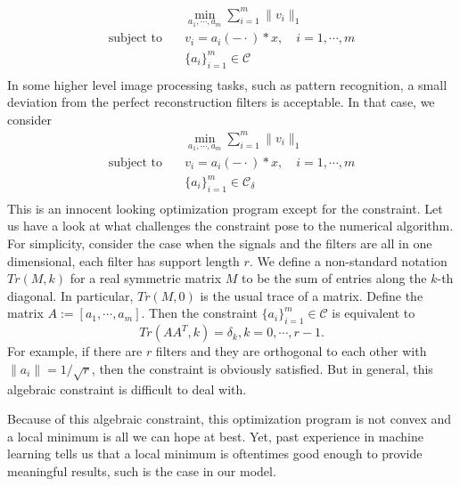 \documentclass[a4paper]{article}
\begin{document}
\begin{equation}
\label{model:m0}
\begin{aligned}
	&\min_{a_1,\cdots,a_m} \sum_{i=1}^m \|v_i\|_1 \\
	\textrm{subject to} \quad&v_i = a_i(-\cdot)*x,\quad i=1,\cdots,m\\
	 & \{a_i\}_{i=1}^m \in \mathcal{C} \\
\end{aligned}
\end{equation}
In some higher level image processing tasks, such as pattern recognition, a small deviation from the perfect reconstruction filters is acceptable. In that case, we consider
\begin{equation}
\label{model:m1}
\begin{aligned}
	&\min_{a_1,\cdots,a_m} \sum_{i=1}^m \|v_i\|_1 \\
	\textrm{subject to} \quad&v_i = a_i(-\cdot)*x,\quad i=1,\cdots,m\\
	 & \{a_i\}_{i=1}^m \in \mathcal{C_\delta} \\
\end{aligned}
\end{equation}
This is an innocent looking optimization program except for the constraint. Let us have a look at what challenges the constraint pose to the numerical algorithm. For simplicity, consider the case when the signals and the filters are all in one dimensional, each filter has support length $r$. We define a non-standard notation $Tr(M,k)$ for a real symmetric matrix $M$ to be the sum of entries along the $k$-th diagonal. In particular, $Tr(M,0)$ is the usual trace of a matrix.
Define the matrix  $A:=[a_1,\cdots,a_m]$. Then the constraint $ \{a_i\}_{i=1}^m \in \mathcal{C}$ is equivalent to 
\[
Tr(AA^T,k)=\delta_k, k=0,\cdots,r-1.
\]
For example, if there are $r$ filters and they are orthogonal to each other with $\|a_i\|=1/\sqrt{r}$, then the constraint is obviously satisfied. But in general, this algebraic constraint is difficult to deal with. 

Because of this algebraic constraint, this optimization program is not convex and a local minimum is all we can hope at best. Yet, past experience in machine learning tells us that a local minimum is oftentimes good enough to provide meaningful results, such is the case in our model.
\end{document}
